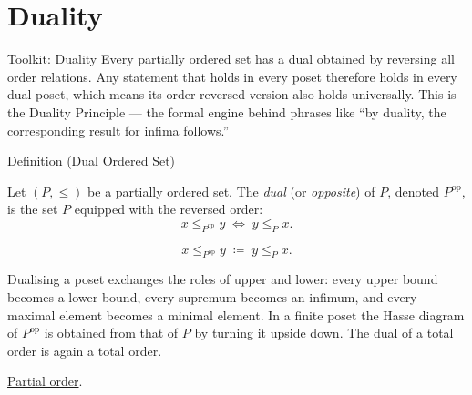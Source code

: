 
\section{Duality}
\label{sec:duality}

\begin{toolkitbox}{Toolkit: Duality}
Every partially ordered set has a dual obtained by reversing all order
relations.  Any statement that holds in every poset therefore holds in
every dual poset, which means its order-reversed version also holds
universally.  This is the Duality Principle — the formal engine behind
phrases like ``by duality, the corresponding result for infima follows.''
\end{toolkitbox}


\begin{definitionbox}{Definition (Dual Ordered Set)}
\begin{definition}
\label{def:dual-ordered-set}
Let $(P, \leq)$ be a partially ordered set.  The \emph{dual} (or
\emph{opposite}) of $P$, denoted $P^{\mathrm{op}}$, is the set $P$
equipped with the reversed order:
\[
x \leq_{P^{\mathrm{op}}} y \;\Longleftrightarrow\; y \leq_P x.
\]
\end{definition}
\end{definitionbox}

\begin{remark*}
\[
x \leq_{P^{\mathrm{op}}} y
\;\coloneqq\;
y \leq_P x.
\]
\end{remark*}

\begin{remark*}[Interpretation]
Dualising a poset exchanges the roles of upper and lower: every upper bound
becomes a lower bound, every supremum becomes an infimum, and every maximal
element becomes a minimal element.  In a finite poset the Hasse diagram of
$P^{\mathrm{op}}$ is obtained from that of $P$ by turning it upside down.
The dual of a total order is again a total order.
\end{remark*}

\begin{remark*}[Dependencies]
\hyperref[def:lattice-order-partial-order]{Partial order}.
\end{remark*}

